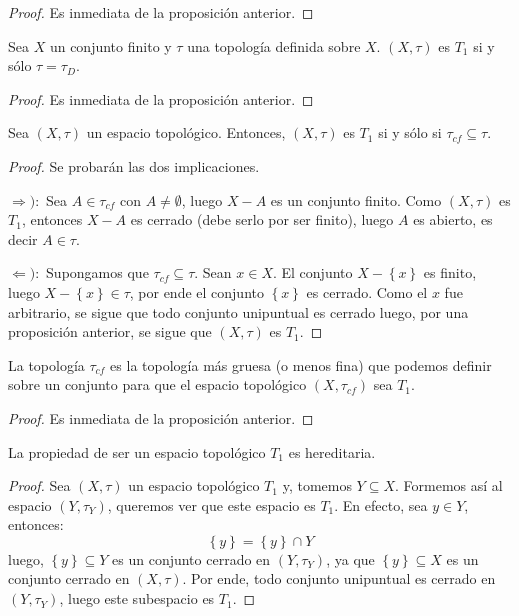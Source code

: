 \documentclass[12pt]{report}
\theoremstyle{largebreak}
\begin{document}
    \begin{proof}
        Es inmediata de la proposición anterior.
    \end{proof}

    \begin{cor}
        Sea $X$ un conjunto finito y $\tau$ una topología definida sobre $X$. $(X,\tau)$ es $T_1$ si y sólo $\tau=\tau_D$.
    \end{cor}

    \begin{proof}
        Es inmediata de la proposición anterior.
    \end{proof}

    \begin{propo}
        Sea $(X,\tau)$ un espacio topológico. Entonces, $(X,\tau)$ es $T_1$ si y sólo si $\tau_{cf}\subseteq\tau$.
    \end{propo}

    \begin{proof}
        Se probarán las dos implicaciones.

        $\Rightarrow):$ Sea $A\in\tau_{cf}$ con $A\neq\emptyset$, luego $X-A$ es un conjunto finito. Como $(X,\tau)$ es $T_1$, entonces $X-A$ es cerrado (debe serlo por ser finito), luego $A$ es abierto, es decir $A\in\tau$.
        
        $\Leftarrow):$ Supongamos que $\tau_{cf}\subseteq\tau$. Sean $x\in X$. El conjunto $X-\left\{x\right\}$ es finito, luego $X-\left\{x\right\}\in\tau$, por ende el conjunto $\left\{x\right\}$ es cerrado. Como el $x$ fue arbitrario, se sigue que todo conjunto unipuntual es cerrado luego, por una proposición anterior, se sigue que $(X,\tau)$ es $T_1$.
    \end{proof}

    \begin{cor}
        La topología $\tau_{cf}$ es la topología más gruesa (o menos fina) que podemos definir sobre un conjunto para que el espacio topológico $(X,\tau_{cf})$ sea $T_1$.
    \end{cor}

    \begin{proof}
        Es inmediata de la proposición anterior.
    \end{proof}

    \begin{propo}
        La propiedad de ser un espacio topológico $T_1$ es hereditaria. 
    \end{propo}

    \begin{proof}
        Sea $(X,\tau)$ un espacio topológico $T_1$ y, tomemos $Y\subseteq X$. Formemos así al espacio $(Y,\tau_Y)$, queremos ver que este espacio es $T_1$. En efecto, sea $y\in Y$, entonces:
        \begin{equation*}
            \left\{y\right\}=\left\{y \right\}\cap Y
        \end{equation*}
        luego, $\left\{y\right\}\subseteq Y$ es un conjunto cerrado en $(Y,\tau_Y)$, ya que $\left\{y\right\}\subseteq X$ es un conjunto cerrado en $(X,\tau)$. Por ende, todo conjunto unipuntual es cerrado en $(Y,\tau_Y)$, luego este subespacio es $T_1$.
    \end{proof}
\end{document}
